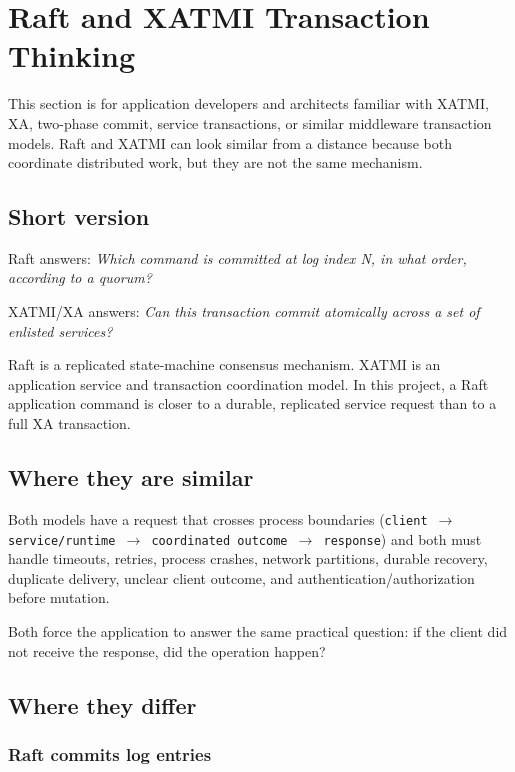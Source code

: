 \section{Raft and XATMI Transaction Thinking}
\label{sec:RaftAndXatmi}

This section is for application developers and architects familiar with
XATMI, XA, two-phase commit, service transactions, or similar middleware
transaction models. Raft and XATMI can look similar from a distance because
both coordinate distributed work, but they are not the same mechanism.

\subsection{Short version}

Raft answers: \emph{Which command is committed at log index N, in what
order, according to a quorum?}

XATMI/XA answers: \emph{Can this transaction commit atomically across a
set of enlisted services?}

Raft is a replicated state-machine consensus mechanism. XATMI is an
application service and transaction coordination model. In this project, a
Raft application command is closer to a durable, replicated service
request than to a full XA transaction.

\subsection{Where they are similar}

Both models have a request that crosses process boundaries
(\texttt{client $\to$ service/runtime $\to$ coordinated outcome $\to$
response}) and both must handle timeouts, retries, process crashes,
network partitions, durable recovery, duplicate delivery, unclear client
outcome, and authentication/authorization before mutation.

Both force the application to answer the same practical question: if the
client did not receive the response, did the operation happen?

\subsection{Where they differ}

\subsubsection{Raft commits log entries}


